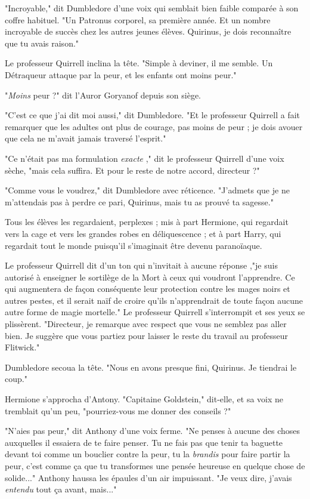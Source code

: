 "Incroyable," dit Dumbledore d'une voix qui semblait bien faible comparée à son coffre habituel. "Un Patronus corporel, sa première année. Et un nombre incroyable de succès chez les autres jeunes élèves. Quirinus, je dois reconnaître que tu avais raison."

Le professeur Quirrell inclina la tête. "Simple à deviner, il me semble. Un Détraqueur attaque par la peur, et les enfants ont moins peur."

"\emph{Moins}  peur ?" dit l'Auror Goryanof depuis son siège.

"C'est ce que j'ai dit moi aussi," dit Dumbledore. "Et le professeur Quirrell a fait remarquer que les adultes ont plus de courage, pas moins de peur ; je dois avouer que cela ne m'avait jamais traversé l'esprit."

"Ce n'était pas ma formulation \emph{exacte} ," dit le professeur Quirrell d'une voix sèche, "mais cela suffira. Et pour le reste de notre accord, directeur ?"

"Comme vous le voudrez," dit Dumbledore avec réticence. "J'admets que je ne m'attendais pas à perdre ce pari, Quirinus, mais tu as prouvé ta sagesse."

Tous les élèves les regardaient, perplexes ; mis à part Hermione, qui regardait vers la cage et vers les grandes robes en déliquescence ; et à part Harry, qui regardait tout le monde puisqu'il s'imaginait être devenu paranoïaque.

Le professeur Quirrell dit d'un ton qui n'invitait à aucune réponse ,"je suis autorisé à enseigner le sortilège de la Mort à ceux qui voudront l'apprendre. Ce qui augmentera de façon conséquente leur protection contre les mages noirs et autres pestes, et il serait naïf de croire qu'ils n'apprendrait de toute façon aucune autre forme de magie mortelle." Le professeur Quirrell s'interrompit et ses yeux se plissèrent. "Directeur, je remarque avec respect que vous ne semblez pas aller bien. Je suggère que vous partiez pour laisser le reste du travail au professeur Flitwick."

Dumbledore secoua la tête. "Nous en avons presque fini, Quirinus. Je tiendrai le coup."

Hermione s'approcha d'Antony. "Capitaine Goldstein," dit-elle, et sa voix ne tremblait qu'un peu, "pourriez-vous me donner des conseils ?"

"N'aies pas peur," dit Anthony d'une voix ferme. "Ne penses à aucune des choses auxquelles il essaiera de te faire penser. Tu ne fais pas que tenir ta baguette devant toi comme un bouclier contre la peur, tu la \emph{brandis}  pour faire partir la peur, c'est comme ça que tu transformes une pensée heureuse en quelque chose de solide..." Anthony haussa les épaules d'un air impuissant. "Je veux dire, j'avais \emph{entendu } tout ça avant, mais..."

